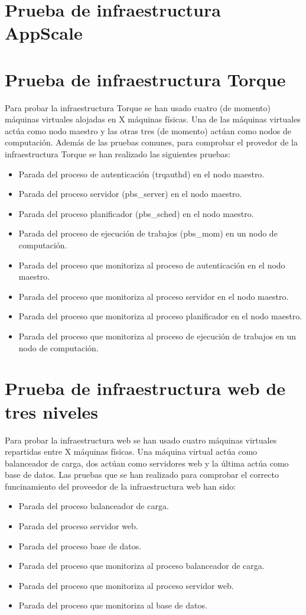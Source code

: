 \section{Prueba de infraestructura AppScale}


\section{Prueba de infraestructura Torque}

Para probar la infraestructura Torque se han usado cuatro (de momento) máquinas virtuales alojadas en X máquinas físicas. Una de las máquinas virtuales actúa como nodo maestro y las otras tres (de momento) actúan como nodos de computación. Además de las pruebas comunes, para comprobar el provedor de la infraestructura Torque se han realizado las siguientes pruebas:

\begin{itemize}
\item Parada del proceso de autenticación (trqauthd) en el nodo maestro.
\item Parada del proceso servidor (pbs\_server) en el nodo maestro.
\item Parada del proceso planificador (pbs\_sched) en el nodo maestro.
\item Parada del proceso de ejecución de trabajos (pbs\_mom) en un nodo de computación.
\item Parada del proceso que monitoriza al proceso de autenticación en el nodo maestro.
\item Parada del proceso que monitoriza al proceso servidor en el nodo maestro.
\item Parada del proceso que monitoriza al proceso planificador en el nodo maestro.
\item Parada del proceso que monitoriza al proceso de ejecución de trabajos en un nodo de computación.
\end{itemize}


\section{Prueba de infraestructura web de tres niveles}

Para probar la infraestructura web se han usado cuatro máquinas virtuales repartidas entre X máquinas físicas. Una máquina virtual actúa como balanceador de carga, dos actúan como servidores web y la última actúa como base de datos. Las pruebas que se han realizado para comprobar el correcto funcinamiento del proveedor de la infraestructura web han sido:

\begin{itemize}
\item Parada del proceso balanceador de carga.
\item Parada del proceso servidor web.
\item Parada del proceso base de datos.
\item Parada del proceso que monitoriza al proceso balanceador de carga.
\item Parada del proceso que monitoriza al proceso servidor web.
\item Parada del proceso que monitoriza al base de datos.
\end{itemize}
